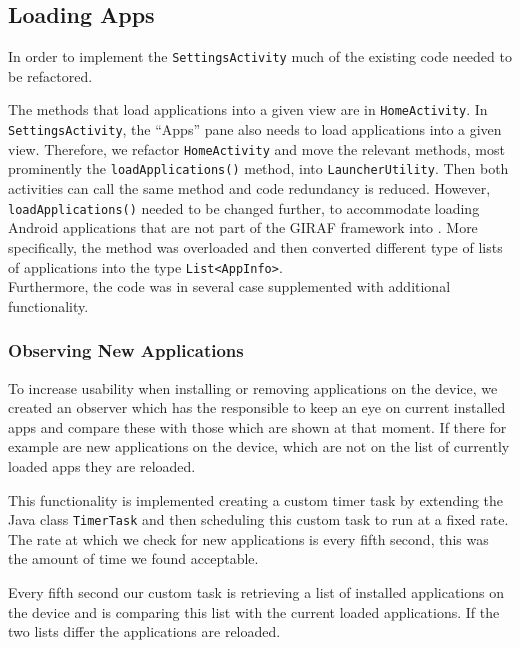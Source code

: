 \subsection{Loading Apps}\label{sect:sprint3:refactoring}
In order to implement the \lstinline!SettingsActivity! much of the existing code needed to be refactored.

The methods that load applications into a given view are in \lstinline!HomeActivity!.
In \lstinline!SettingsActivity!, the ``Apps'' pane also needs to load applications into a given view.
Therefore, we refactor \lstinline!HomeActivity! and move the relevant methods, most prominently the \lstinline|loadApplications()| method, into \lstinline!LauncherUtility!.
Then both activities can call the same method and code redundancy is reduced. 
However, \lstinline|loadApplications()| needed to be changed further, to accommodate loading Android applications that are not part of the GIRAF framework  into \launcher. 
More specifically, the method was overloaded and then converted different type of lists of applications into the \giraf type \lstinline|List<AppInfo>|.\\

Furthermore, the code was in several case supplemented with additional functionality.

\subsubsection{Observing New Applications}\label{sec:sprint3:observing}
To increase usability when installing or removing applications on the device, we created an observer which has the responsible to keep an eye on current installed apps and compare these with those which are shown at that moment. If there for example are new applications on the device, which are not on the list of currently loaded apps they are reloaded.

This functionality is implemented creating a custom timer task by extending the Java class \lstinline!TimerTask! and then scheduling this custom task to run at a fixed rate. The rate at which we check for new applications is every fifth second, this was the amount of time we found acceptable.

Every fifth second our custom task is retrieving a list of installed applications on the device and is comparing this list with the current loaded applications. If the two lists differ the applications are reloaded.